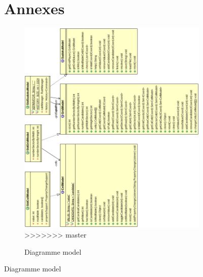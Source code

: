 \begin{figure}[ht]
\section{Annexes}
\begin{figure}[ht]
  \caption{\label{annexe16} Diagramme model}
  \includegraphics [width=160mm]{images/model.png} \\[0.5cm]
>>>>>>> master
\end{figure}


\end{figure}
